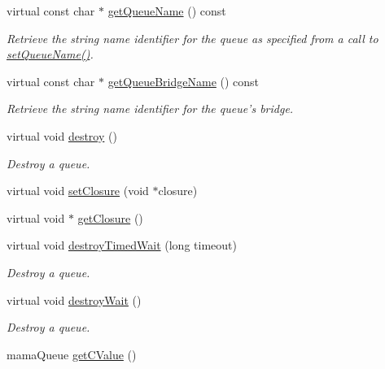 \begin{DoxyCompactItemize}
virtual const char $\ast$ \hyperlink{classWombat_1_1MamaQueue_a123d62bb20895701ac0407831f3cad1f}{getQueueName} () const 
\begin{DoxyCompactList}\small\item\em Retrieve the string name identifier for the queue as specified from a call to {\ttfamily \hyperlink{classWombat_1_1MamaQueue_ab44bf7f7f43693737d58f0155dbf7cc3}{setQueueName()}}. \item\end{DoxyCompactList}\item 
virtual const char $\ast$ \hyperlink{classWombat_1_1MamaQueue_ae3cbaac8f65debeb5989f0d084091033}{getQueueBridgeName} () const 
\begin{DoxyCompactList}\small\item\em Retrieve the string name identifier for the queue's bridge. \item\end{DoxyCompactList}\item 
virtual void \hyperlink{classWombat_1_1MamaQueue_af2833301877225698f9d01c19b4ff509}{destroy} ()
\begin{DoxyCompactList}\small\item\em Destroy a queue. \item\end{DoxyCompactList}\item 
virtual void \hyperlink{classWombat_1_1MamaQueue_a5e4ea93c990531720075e28f27cf8f9d}{setClosure} (void $\ast$closure)
\item 
virtual void $\ast$ \hyperlink{classWombat_1_1MamaQueue_a3c964b97c67511bfa2f994790d6ba291}{getClosure} ()
\item 
virtual void \hyperlink{classWombat_1_1MamaQueue_a6bd9863e8aab8b7ca7d10120dc6eb2c5}{destroyTimedWait} (long timeout)
\begin{DoxyCompactList}\small\item\em Destroy a queue. \item\end{DoxyCompactList}\item 
virtual void \hyperlink{classWombat_1_1MamaQueue_a2e34e08c5fcf44cf3b347071c1501ec5}{destroyWait} ()
\begin{DoxyCompactList}\small\item\em Destroy a queue. \item\end{DoxyCompactList}\item 
mamaQueue \hyperlink{classWombat_1_1MamaQueue_a574267c7489b3e4db622befb1f07fcc4}{getCValue} ()

\end{DoxyCompactItemize}
